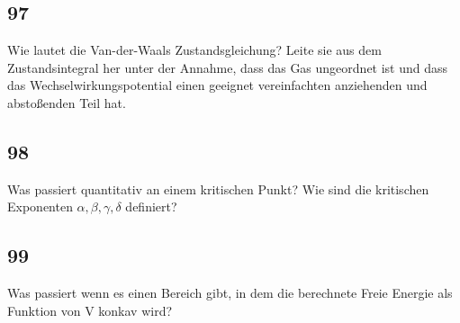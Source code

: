 \subsection{97}
\begin{myfrag}
Wie lautet die Van-der-Waals Zustandsgleichung? Leite sie aus dem
Zustandsintegral her unter der Annahme, dass das Gas ungeordnet ist und
dass das Wechselwirkungspotential einen geeignet vereinfachten anziehenden
und abstoßenden Teil hat.
\end{myfrag} 
\subsection{98}
\begin{myfrag}
Was passiert quantitativ an einem kritischen Punkt? Wie sind die kritischen
Exponenten $\alpha, \beta , \gamma , \delta $ definiert? 
\end{myfrag} 
\subsection{99}
\begin{myfrag}
Was passiert wenn es einen Bereich gibt, in dem die berechnete Freie Energie
als Funktion von V konkav wird?
\end{myfrag} 
